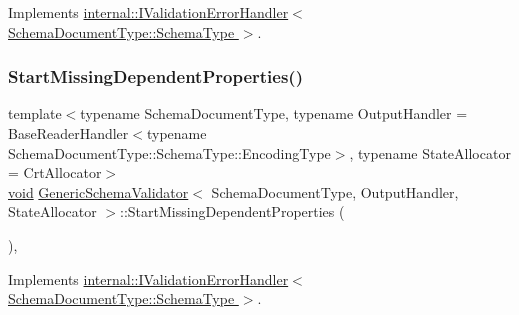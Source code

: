 Implements \hyperlink{classinternal_1_1IValidationErrorHandler_a994a8b1526a79737b9d7b7575def4f65}{internal\+::\+I\+Validation\+Error\+Handler$<$ Schema\+Document\+Type\+::\+Schema\+Type $>$}.

\mbox{\label{classGenericSchemaValidator_ac4faa073bc4671f42e98a59a9e9cb01a}} 
\subsubsection{\texorpdfstring{Start\+Missing\+Dependent\+Properties()}{StartMissingDependentProperties()}}
{\footnotesize\ttfamily template$<$typename Schema\+Document\+Type, typename Output\+Handler = Base\+Reader\+Handler$<$typename Schema\+Document\+Type\+::\+Schema\+Type\+::\+Encoding\+Type$>$, typename State\+Allocator = Crt\+Allocator$>$ \\
\hyperlink{imgui__impl__opengl3__loader_8h_ac668e7cffd9e2e9cfee428b9b2f34fa7}{void} \hyperlink{classGenericSchemaValidator}{Generic\+Schema\+Validator}$<$ Schema\+Document\+Type, Output\+Handler, State\+Allocator $>$\+::Start\+Missing\+Dependent\+Properties (\begin{DoxyParamCaption}{ }\end{DoxyParamCaption})\hspace{0.3cm}{\ttfamily [inline]}, {\ttfamily [virtual]}}



Implements \hyperlink{classinternal_1_1IValidationErrorHandler_ae312aea74718dda0411af023c0c78ef6}{internal\+::\+I\+Validation\+Error\+Handler$<$ Schema\+Document\+Type\+::\+Schema\+Type $>$}.

\mbox{\label{classGenericSchemaValidator_a41c4d67e349561f13948a5045bfc50c9}} 
